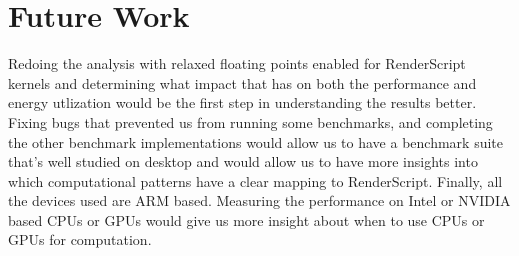 \section{Future Work}

Redoing the analysis with relaxed floating points enabled for RenderScript kernels
	and determining what impact that has on both the performance and energy utlization
	would be the first step in understanding the results better.
Fixing bugs that prevented us from running some benchmarks, and completing the
	other benchmark implementations would allow us to have a benchmark
	suite that's well studied on desktop and would allow us to have more insights
	into which computational patterns have a clear mapping to RenderScript.
Finally, all the devices used are ARM based.
Measuring the performance on Intel or NVIDIA based CPUs or GPUs would give us
	more insight about when to use CPUs or GPUs for computation.